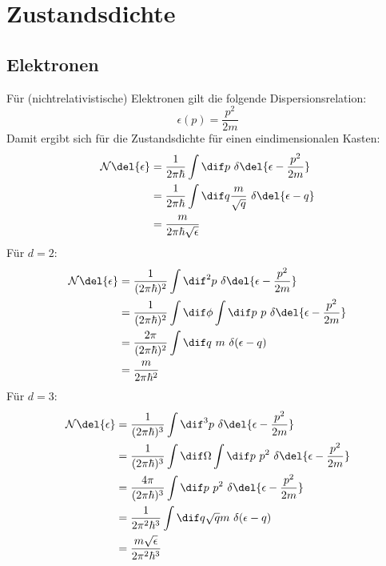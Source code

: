 \section{Zustandsdichte}
\subsection{Elektronen}
Für (nichtrelativistische) Elektronen gilt die folgende Dispersionsrelation:
\[\epsilon (p) = \frac{p^2}{2m} \]
Damit ergibt sich für die Zustandsdichte für einen eindimensionalen Kasten:
\begin{align*}
\mathcal{N}\del{\epsilon} &= \frac{1}{2\pi\hbar} \int \dif p \  \delta\del{\epsilon - \frac{p^2}{2m}} \\
&= \frac{1}{2\pi\hbar} \int \dif q \frac{m}{\sqrt{q}} \ \delta \del{\epsilon-q} \\
&= \frac{m}{2\pi\hbar\sqrt{\epsilon}} \\
\end{align*}
Für $d=2$:
\begin{align*}
\mathcal{N}\del{\epsilon} &= \frac{1}{(2\pi\hbar)^2} \int \dif^2 p \ \delta \del{\epsilon-\frac{p^2}{2m}} \\
&=\frac{1}{(2\pi\hbar)^2} \int \dif \phi \int \dif p \ p \ \delta \del{\epsilon-\frac{p^2}{2m}} \\
&=\frac{2\pi}{(2\pi\hbar)^2} \int \dif q \ m \ \delta(\epsilon-q) \\
&=\frac{m}{2\pi\hbar^2} \\
\end{align*}
Für $d=3$:
\begin{align*}
\mathcal{N}\del{\epsilon} &= \frac{1}{(2\pi\hbar)^3} \int \dif^3 p \ \delta \del{\epsilon-\frac{p^2}{2m}} \\
&= \frac{1}{(2\pi\hbar)^3} \int \dif \Omega \int \dif p \ p^2 \ \delta \del{\epsilon-\frac{p^2}{2m}} \\
&= \frac{4\pi}{(2\pi\hbar)^3} \int \dif p \ p^2 \ \delta\del{\epsilon-\frac{p^2}{2m}} \\
&= \frac{1}{2\pi^2\hbar^3} \int \dif q \sqrt{q} m \ \delta(\epsilon-q) \\
&= \frac{m \sqrt{\epsilon}}{2\pi^2\hbar^3}
\end{align*}

